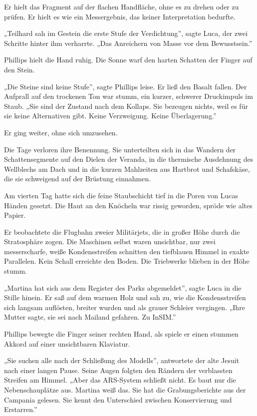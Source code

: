 \documentclass[
  ngerman,
]{article}
\begin{document}
Er hielt das Fragment auf der flachen Handfläche, ohne es zu drehen oder
zu prüfen. Er hielt es wie ein Messergebnis, das keiner Interpretation
bedurfte.

„Teilhard sah im Gestein die erste Stufe der Verdichtung'', sagte Luca,
der zwei Schritte hinter ihm verharrte. „Das Anreichern von Masse vor
dem Bewusstsein.''

Phillips hielt die Hand ruhig. Die Sonne warf den harten Schatten der
Finger auf den Stein.

„Die Steine sind keine Stufe'', sagte Phillips leise. Er ließ den Basalt
fallen. Der Aufprall auf den trockenen Ton war stumm, ein kurzer,
schwerer Druckimpuls im Staub. „Sie sind der Zustand nach dem Kollaps.
Sie bezeugen nichts, weil es für sie keine Alternativen gibt. Keine
Verzweigung. Keine Überlagerung.''

Er ging weiter, ohne sich umzusehen.

Die Tage verloren ihre Benennung. Sie unterteilten sich in das Wandern
der Schattensegmente auf den Dielen der Veranda, in die thermische
Ausdehnung des Wellblechs am Dach und in die kurzen Mahlzeiten aus
Hartbrot und Schafskäse, die sie schweigend auf der Brüstung einnahmen.

Am vierten Tag hatte sich die feine Staubschicht tief in die Poren von
Lucas Händen gesetzt. Die Haut an den Knöcheln war rissig geworden,
spröde wie altes Papier.

Er beobachtete die Flugbahn zweier Militärjets, die in großer Höhe durch
die Stratosphäre zogen. Die Maschinen selbst waren unsichtbar, nur zwei
messerscharfe, weiße Kondensstreifen schnitten den tiefblauen Himmel in
exakte Parallelen. Kein Schall erreichte den Boden. Die Triebwerke
blieben in der Höhe stumm.

„Martina hat sich aus dem Register des Parks abgemeldet'', sagte Luca in
die Stille hinein. Er saß auf dem warmen Holz und sah zu, wie die
Kondensstreifen sich langsam auflösten, breiter wurden und als grauer
Schleier vergingen. „Ihre Mutter sagte, sie sei nach Mailand gefahren.
Zu InSIM.''

Phillips bewegte die Finger seiner rechten Hand, als spiele er einen
stummen Akkord auf einer unsichtbaren Klaviatur.

„Sie suchen alle nach der Schließung des Modells'', antwortete der alte
Jesuit nach einer langen Pause. Seine Augen folgten den Rändern der
verblassten Streifen am Himmel. „Aber das ARS-System schließt nicht. Es
baut nur die Nebenschauplätze aus. Martina weiß das. Sie hat die
Grabungsberichte aus der Campania gelesen. Sie kennt den Unterschied
zwischen Konservierung und Erstarren.''
\end{document}
